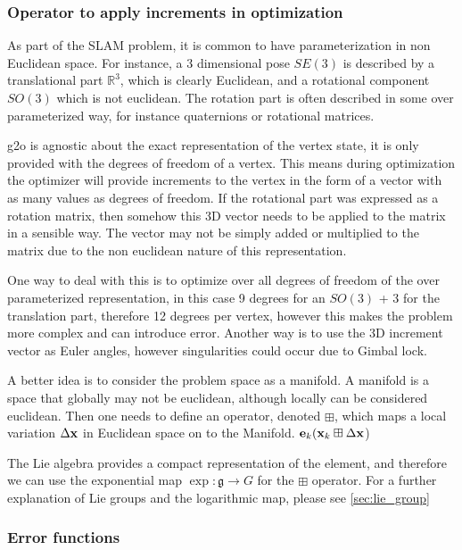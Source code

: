 \subsubsection{Operator to apply increments in optimization}
As part of the SLAM problem, it is common to have parameterization in non Euclidean space.  For instance, a 3 dimensional pose $SE(3)$ is described by a translational part $\mathbb{R}^3$, which is clearly Euclidean, and a rotational component $SO(3)$ which is not euclidean.  The rotation part is often described in some over parameterized way, for instance quaternions or rotational matrices.  

g2o is agnostic about the exact representation of the vertex state, it is only provided with the degrees of freedom of a vertex.  This means during optimization the optimizer will provide increments to the vertex in the form of a vector with as many values as degrees of freedom.  If the rotational part was expressed as a rotation matrix, then somehow this 3D vector needs to be applied to the matrix in a sensible way.  The vector may not be simply added or multiplied to the matrix due to the non euclidean nature of this representation.

One way to deal with this is to optimize over all degrees of freedom of the over parameterized representation, in this case 9 degrees for an $SO(3)$ + 3 for the translation part, therefore 12 degrees per vertex, however this makes the problem more complex and can introduce error.  Another way is to use the 3D increment vector as Euler angles, however singularities could occur due to Gimbal lock.

A better idea is to consider the problem space as a manifold.  A manifold is a space that globally may not be euclidean, although locally can be considered euclidean.  Then one needs to define an operator, denoted $\boxplus$, which maps a local variation $\Delta\mathbf x$ in Euclidean space on to the Manifold. $\mathbf e_k(\mathbf x_k \boxplus \Delta\mathbf x$)

The Lie algebra provides a compact representation of the element, and therefore we can use the exponential map $\exp\colon \mathfrak g \to G$ for the $\boxplus$ operator.  For a further explanation of Lie groups and the logarithmic map, please see \ref{sec:lie_group}

\subsubsection{Error functions}

